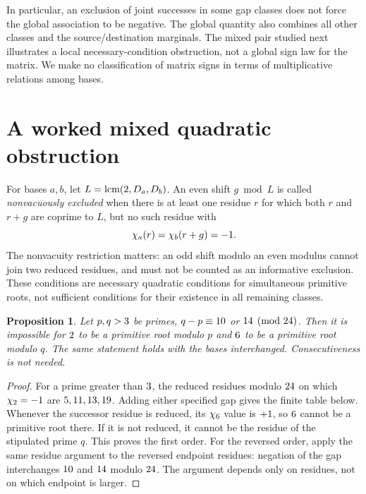 \documentclass[11pt]{article}
\newtheorem{proposition}{Proposition}
\begin{document}
In particular, an exclusion of joint successes in some gap classes does not
force the global association to be negative. The global quantity also combines
all other classes and the source/destination marginals. The mixed pair studied
next illustrates a local necessary-condition obstruction, not a global sign
law for the matrix. We make no classification of matrix signs in terms of
multiplicative relations among bases.

\section{A worked mixed quadratic obstruction}
For bases $a,b$, let $L=\operatorname{lcm}(2,D_a,D_b)$.
An even shift $g\bmod L$ is called \emph{nonvacuously excluded} when there is at
least one residue $r$ for which both $r$ and $r+g$ are coprime to $L$, but no such
residue with
\[
 \chi_a(r)=\chi_b(r+g)=-1.
\]
The nonvacuity restriction matters: an odd shift modulo an even modulus cannot
join two reduced residues, and must not be counted as an informative exclusion.
These conditions are necessary quadratic conditions for simultaneous primitive
roots, not sufficient conditions for their existence in all remaining classes.

\begin{proposition}
Let $p,q>3$ be primes, $q-p\equiv10$ or $14\pmod{24}$.
Then it is impossible for $2$ to be a primitive root modulo $p$ and $6$
to be a primitive root modulo $q$. The same statement holds with the bases
interchanged. Consecutiveness is not needed.
\end{proposition}
\begin{proof}
For a prime greater than $3$, the reduced residues modulo $24$
on which $\chi_{2}=-1$ are
$5,11,13,19$. Adding either specified gap gives the
finite table below. Whenever the successor residue is reduced, its
$\chi_{6}$ value is $+1$, so $6$ cannot be a primitive root there.
If it is not reduced, it cannot be the residue of the stipulated prime $q$.
This proves the first order. For the reversed order, apply the same residue
argument to the reversed endpoint residues: negation of the gap interchanges
$10$ and $14$ modulo $24$. The argument depends only on
residues, not on which endpoint is larger.
\end{proof}

\begin{table}[htbp]\centering

\caption{The complete residue check used in the mixed obstruction.}
\end{table}
\end{document}
